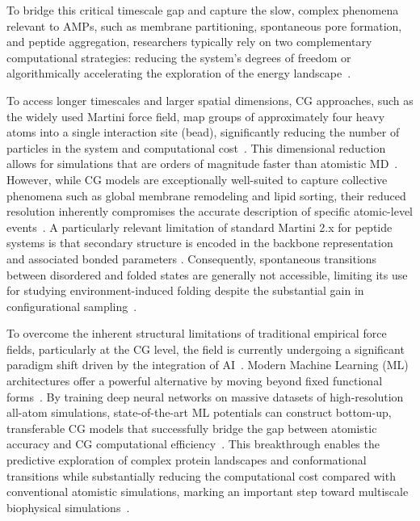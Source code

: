 To bridge this critical timescale gap and capture the slow, complex phenomena relevant to AMPs, such as membrane partitioning, spontaneous pore formation, and peptide aggregation, researchers typically rely on two complementary computational strategies: reducing the system's degrees of freedom or algorithmically accelerating the exploration of the energy landscape~\cite{GF2016,Calvelo2019,Xandre2021,Conde2022}.

To access longer timescales and larger spatial dimensions, CG approaches, such as the widely used Martini force field, map groups of approximately four heavy atoms into a single interaction site (bead), significantly reducing the number of particles in the system and computational cost~\cite{martini2}. This dimensional reduction allows for simulations that are orders of magnitude faster than atomistic MD~\cite{Claro2020,Claro2021}. However, while CG models are exceptionally well-suited to capture collective phenomena such as global membrane remodeling and lipid sorting, their reduced resolution inherently compromises the accurate description of specific atomic-level events~\cite{paper_alfonso}. A particularly relevant limitation of standard Martini 2.x for peptide systems is that secondary structure is encoded in the backbone representation and associated bonded parameters \cite{MPro}. Consequently, spontaneous transitions between disordered and folded states are generally not accessible, limiting its use for studying environment-induced folding despite the substantial gain in configurational sampling~\cite{limitation_martini_1,charron2025navigating,SIRAH,paper_alfonso}.

To overcome the inherent structural limitations of traditional empirical force fields, particularly at the CG level, the field is currently undergoing a significant paradigm shift driven by the integration of AI~\cite{cecilia_1}. Modern Machine Learning (ML) architectures offer a powerful alternative by moving beyond fixed functional forms~\cite{cecilia_1}. By training deep neural networks on massive datasets of high-resolution all-atom simulations, state-of-the-art ML potentials can construct bottom-up, transferable CG models that successfully bridge the gap between atomistic accuracy and CG computational efficiency~\cite{charron2025navigating}. This breakthrough enables the predictive exploration of complex protein landscapes and conformational transitions while substantially reducing the computational cost compared with conventional atomistic simulations, marking an important step toward multiscale biophysical simulations~\cite{charron2025navigating}.

